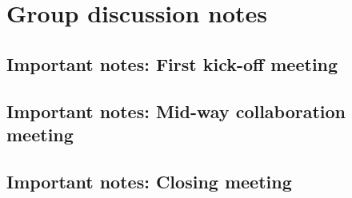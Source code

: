 \chapter{Group discussion notes}
\label{appendix2-group-discussion-notes}

\section*{Important notes: First kick-off meeting}

\section*{Important notes: Mid-way collaboration meeting}

\section*{Important notes: Closing meeting}
